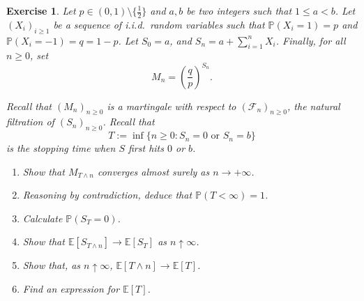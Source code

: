 \documentclass{article}
\newtheorem{exercise}[theorem]{Exercise}
\begin{document}
\begin{exercise}
Let $p \in (0,1) \setminus \{\tfrac{1}{2}\}$ and $a, b$ be two integers such that $1 \leq a < b$. Let $(X_i)_{i \geq 1}$ be a sequence of i.i.d.\ random variables such that $\mathbb{P}(X_i = 1) = p$ and $\mathbb{P}(X_i = -1) = q = 1 - p$. Let $S_0 = a$, and $S_n = a + \sum_{i=1}^n X_i$. Finally, for all $n \geq 0$, set
\[
M_n = \left( \frac{q}{p} \right)^{S_n}.
\]

Recall that $(M_n)_{n \geq 0}$ is a martingale with respect to $(\mathcal{F}_n)_{n \geq 0}$, the natural filtration of $(S_n)_{n \geq 0}$. Recall that 
\[
T := \inf\{n \geq 0 : S_n = 0 \text{ or } S_n = b\}
\]
is the stopping time when $S$ first hits $0$ or $b$.

\begin{enumerate}
    \item[(a)] Show that $M_{T \wedge n}$ converges almost surely as $n \to +\infty$.
    \item[(b)] Reasoning by contradiction, deduce that $\mathbb{P}(T < \infty) = 1$.
    \item[(c)] Calculate $\mathbb{P}(S_T = 0)$.
    \item[(d)] Show that $\mathbb{E}[S_{T \wedge n}] \to \mathbb{E}[S_T]$ as $n \uparrow \infty$.
    \item[(e)] Show that, as $n \uparrow \infty$, $\mathbb{E}[T \wedge n] \to \mathbb{E}[T]$.
    \item[(f)] Find an expression for $\mathbb{E}[T]$.
\end{enumerate}
\end{exercise}
\end{document}
